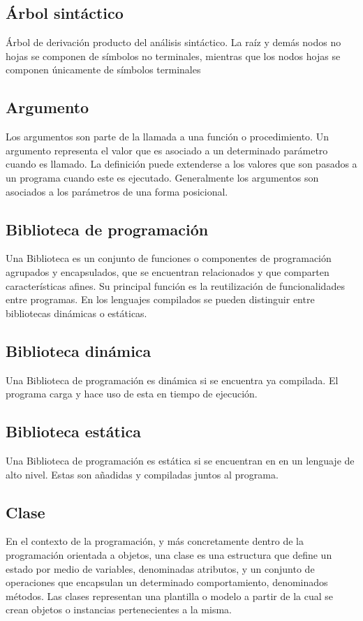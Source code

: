 \subsection {Árbol sintáctico}
Árbol de derivación producto del análisis sintáctico. La raíz y demás nodos no hojas se componen de símbolos no terminales, mientras que los nodos hojas se componen únicamente de símbolos
terminales

\subsection {Argumento}
Los argumentos son parte de la llamada a una función o procedimiento. Un argumento representa el valor que es asociado a un determinado parámetro cuando es llamado. La definición puede extenderse a los valores que son pasados
a un programa cuando este es ejecutado. Generalmente los argumentos son asociados a los parámetros de una forma posicional.

\subsection {Biblioteca de programación}
Una Biblioteca es un conjunto de funciones o componentes de programación agrupados y encapsulados, que se encuentran relacionados y que comparten características afines. 
Su principal función es la reutilización de funcionalidades entre programas. En los lenguajes compilados se pueden distinguir entre bibliotecas dinámicas o estáticas.

\subsection {Biblioteca dinámica}
Una Biblioteca de programación es dinámica si se encuentra ya compilada. El programa carga y hace uso de esta en tiempo de ejecución.

\subsection {Biblioteca estática}
Una Biblioteca de programación es estática si se encuentran en en un lenguaje de alto nivel. Estas son añadidas y compiladas juntos al programa.

\subsection{Clase}
En el contexto de la programación, y más concretamente dentro de la programación orientada a objetos, una clase es una estructura que define un estado por medio de variables, 
denominadas atributos, y un conjunto de operaciones que encapsulan un determinado comportamiento, denominados métodos. Las clases representan una plantilla o modelo a partir de 
la cual se crean objetos o instancias pertenecientes a la misma. 

